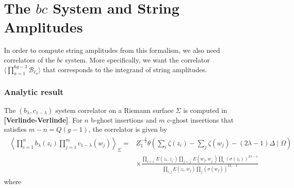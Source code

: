 \documentclass[12pt,letterpaper]{article}
\def\ie{\begin{equation}\begin{aligned}}
\def\fe{\end{aligned}\end{equation}}
\numberwithin{equation}{section}
\begin{document}
\section{The $bc$ System and String Amplitudes}

In order to compute string amplitudes from this formalism, we also need correlators of the $bc$ system. More specifically, we want the correlator $\langle \prod_{a=1}^{6g-3}\mathcal{B}_{\ell_a}\rangle$ that corresponds to the integrand of string amplitudes.

\subsubsection*{Analytic result}

The $(b_\lambda, c_{1-\lambda})$ system correlator on a Riemann surface $\Sigma$ is computed in \textbf{[Verlinde-Verlinde]}. For $n$ b-ghost insertions and $m$ c-ghost insertions that satisfies $m-n=Q(g-1)$, the correlator is given by
\ie
\begin{aligned}
\left\langle\prod_{i=1}^n b_\lambda\left(z_i\right) \prod_{j=1}^m c_{1-\lambda}\left(w_j\right)\right\rangle_{\Sigma}= & Z_1^{-\frac{1}{2}} \theta\left(\sum_i \zeta\left(z_i\right)-\sum_j \zeta\left(w_j\right)-(2 \lambda-1) \Delta \mid \Omega\right) \\
& \times \frac{\prod_{i<i^{\prime}} E\left(z_i, z_{i^{\prime}}\right) \prod_{j<j^{\prime}} E\left(w_j, w_{j^{\prime}}\right) \prod_i\left(\sigma\left(z_i\right)\right)^{2 \lambda-1}}{\prod_{i, j} E\left(z_i, w_j\right) \prod_j\left(\sigma\left(w_j\right)\right)^{2 \lambda-1}}
\end{aligned}
\fe
where
\end{document}
